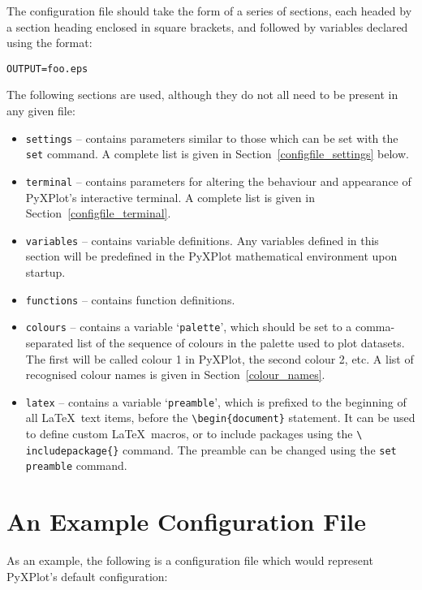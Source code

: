The configuration file should take the form of a series of sections, each
headed by a section heading enclosed in square brackets, and followed by
variables declared using the format:

\begin{verbatim} 
OUTPUT=foo.eps
\end{verbatim}

The following sections are used, although they do not all need to be present in
any given file:

\begin{itemize}
\item \texttt{settings} -- contains parameters similar to those which can be set with the \texttt{set} command. A complete list is given in Section~\ref{configfile_settings} below.
\item \texttt{terminal} -- contains parameters for altering the behaviour and appearance of PyXPlot's interactive terminal. A complete list is given in Section~\ref{configfile_terminal}.
\item \texttt{variables} -- contains variable definitions. Any variables defined in this section will be predefined in the PyXPlot mathematical environment upon startup.
\item \texttt{functions} -- contains function definitions.
\item \texttt{colours} -- contains a variable `\texttt{palette}', which should be set to a comma-separated list of the sequence of colours in the palette used to plot datasets. The first will be called colour 1 in PyXPlot, the second colour 2, etc. A list of recognised colour names is given in Section~\ref{colour_names}.
\item \texttt{latex} -- contains a variable `\texttt{preamble}', which is
prefixed to the beginning of all \LaTeX\ text items, before the
\texttt{\textbackslash begin\{document\}} statement. It can be used to define
custom \LaTeX\ macros, or to include packages using the \texttt{\textbackslash
includepackage\{\}} command.  The preamble can be changed using the {\tt set
preamble} command.
\end{itemize}

\section{An Example Configuration File}
\noindent As an example, the following is a configuration file
which would represent PyXPlot's default configuration:

